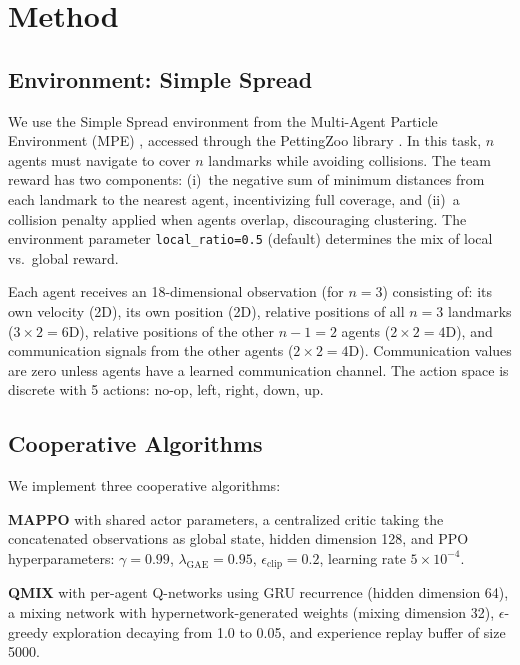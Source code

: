\documentclass[12pt,a4paper]{article}
\begin{document}
\section{Method}
\label{sec:method}

\subsection{Environment: Simple Spread}

We use the Simple Spread environment from the Multi-Agent Particle Environment (MPE) \citep{lowe2017multi}, accessed through the PettingZoo library \citep{terry2021pettingzoo}. In this task, $n$ agents must navigate to cover $n$ landmarks while avoiding collisions. The team reward has two components: (i)~the negative sum of minimum distances from each landmark to the nearest agent, incentivizing full coverage, and (ii)~a collision penalty applied when agents overlap, discouraging clustering. The environment parameter \texttt{local\_ratio=0.5} (default) determines the mix of local vs.\ global reward.

Each agent receives an 18-dimensional observation (for $n=3$) consisting of: its own velocity (2D), its own position (2D), relative positions of all $n=3$ landmarks ($3 \times 2 = 6$D), relative positions of the other $n-1=2$ agents ($2 \times 2 = 4$D), and communication signals from the other agents ($2 \times 2 = 4$D). Communication values are zero unless agents have a learned communication channel. The action space is discrete with 5 actions: no-op, left, right, down, up.

\subsection{Cooperative Algorithms}

We implement three cooperative algorithms:

\textbf{MAPPO} with shared actor parameters, a centralized critic taking the concatenated observations as global state, hidden dimension 128, and PPO hyperparameters: $\gamma = 0.99$, $\lambda_\text{GAE} = 0.95$, $\epsilon_\text{clip} = 0.2$, learning rate $5 \times 10^{-4}$.

\textbf{QMIX} with per-agent Q-networks using GRU recurrence (hidden dimension 64), a mixing network with hypernetwork-generated weights (mixing dimension 32), $\epsilon$-greedy exploration decaying from 1.0 to 0.05, and experience replay buffer of size 5000.
\end{document}
